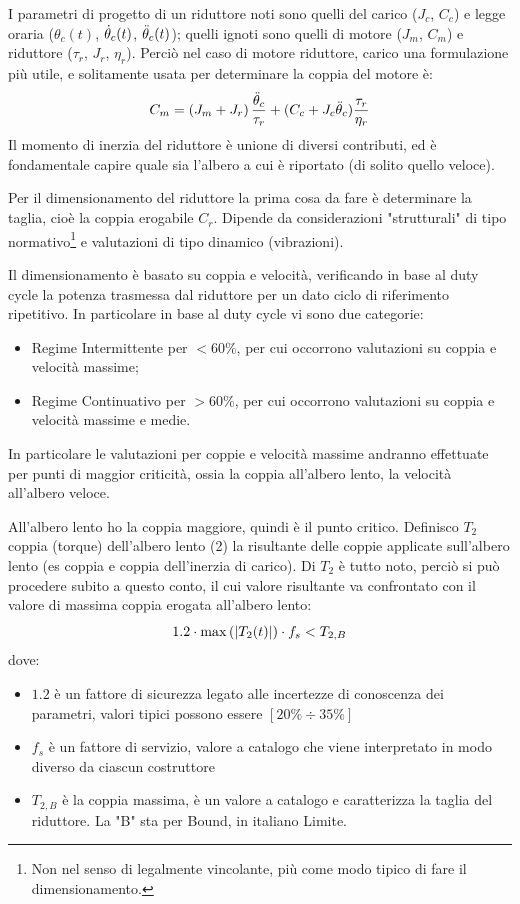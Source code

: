 I parametri di progetto di un riduttore noti sono quelli del carico ($J_c$, $C_c$) e legge oraria ($\theta_c(t)$, $\dot{\theta}_c(t)$, $\Ddot{\theta}_c(t)$); quelli ignoti sono quelli di motore ($J_m$, $C_m$) e riduttore ($\tau_r$, $J_r$, $\eta_r$).
Perciò nel caso di motore riduttore, carico una formulazione più utile, e solitamente usata per determinare la coppia del motore è: 
\[C_m = \left(J_m+J_r\right)\frac{\Ddot{\theta}_c}{\tau_r} + (C_c + J_c \Ddot{\theta}_c)\frac{\tau_r}{\eta_r}\]
Il momento di inerzia del riduttore è unione di diversi contributi, ed è fondamentale capire quale sia l'albero a cui è riportato (di solito quello veloce).

Per il dimensionamento del riduttore la prima cosa da fare è determinare la taglia, cioè la coppia erogabile $C_r$.
Dipende da considerazioni "strutturali" di tipo normativo\footnote{Non nel senso di legalmente vincolante, più come modo tipico di fare il dimensionamento.} e valutazioni di tipo dinamico (vibrazioni).

Il dimensionamento è basato su coppia e velocità, verificando in base al duty cycle la potenza trasmessa dal riduttore per un dato ciclo di riferimento ripetitivo.
In particolare in base al duty cycle vi sono due categorie: 
\begin{itemize}
    \item Regime Intermittente per $<60\%$, per cui occorrono valutazioni su coppia e velocità massime; 
    \item Regime Continuativo per $>60\%$, per cui occorrono valutazioni su coppia e velocità massime e medie.
\end{itemize}
In particolare le valutazioni per coppie e velocità massime andranno effettuate per punti di maggior criticità, ossia la coppia all'albero lento, la velocità all'albero veloce.

All'albero lento ho la coppia maggiore, quindi è il punto critico. 
Definisco $T_2$ coppia (torque) dell'albero lento (2) la risultante delle coppie applicate sull'albero lento (es coppia e coppia dell'inerzia di carico).
Di $T_2$ è tutto noto, perciò si può procedere subito a questo conto, il cui valore risultante va confrontato con il valore di massima coppia erogata all'albero lento: 
\[1.2\cdot \operatorname{max}\left(\left|T_2(t)\right|\right)\cdot f_s < T_{2,B}\]
dove:
\begin{itemize}
    \item $1.2$ è un fattore di sicurezza legato alle incertezze di conoscenza dei parametri, valori tipici possono essere $[20\%\div 35\%]$
    \item $f_s$ è un fattore di servizio, valore a catalogo che viene interpretato in modo diverso da ciascun costruttore
    \item $T_{2,B}$ è la coppia massima, è un valore a catalogo e caratterizza la taglia del riduttore. La "B" sta per Bound, in italiano Limite.
\end{itemize}

